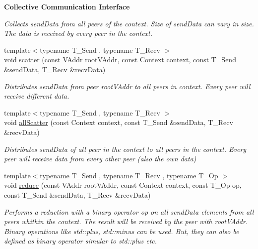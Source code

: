 \begin{Indent}{\bf Collective Communication Interface}
\begin{DoxyCompactItemize}
\begin{DoxyCompactList}\small\item\em Collects {\itshape send\+Data} from all peers of the {\itshape context}. Size of {\itshape send\+Data} can vary in size. The data is received by every peer in the {\itshape context}. \end{DoxyCompactList}\item 
{\footnotesize template$<$typename T\+\_\+\+Send , typename T\+\_\+\+Recv $>$ }\\void \hyperlink{structgraybat_1_1communicationPolicy_1_1Base_af1ed07ce5f107f04926d7b7c39c9834e}{scatter} (const V\+Addr root\+V\+Addr, const Context context, const T\+\_\+\+Send \&send\+Data, T\+\_\+\+Recv \&recv\+Data)
\begin{DoxyCompactList}\small\item\em Distributes {\itshape send\+Data} from peer {\itshape root\+V\+Addr} to all peers in {\itshape context}. Every peer will receive different data. \end{DoxyCompactList}\item 
{\footnotesize template$<$typename T\+\_\+\+Send , typename T\+\_\+\+Recv $>$ }\\void \hyperlink{structgraybat_1_1communicationPolicy_1_1Base_ac4aa66d3ed33c810ae48ae762b432b14}{all\+Scatter} (const Context context, const T\+\_\+\+Send \&send\+Data, T\+\_\+\+Recv \&recv\+Data)
\begin{DoxyCompactList}\small\item\em Distributes {\itshape send\+Data} of all peer in the {\itshape context} to all peers in the {\itshape context}. Every peer will receive data from every other peer (also the own data) \end{DoxyCompactList}\item 
{\footnotesize template$<$typename T\+\_\+\+Send , typename T\+\_\+\+Recv , typename T\+\_\+\+Op $>$ }\\void \hyperlink{structgraybat_1_1communicationPolicy_1_1Base_ad3bf74c91931b35b56fbb54ac535bc14}{reduce} (const V\+Addr root\+V\+Addr, const Context context, const T\+\_\+\+Op op, const T\+\_\+\+Send \&send\+Data, T\+\_\+\+Recv \&recv\+Data)
\begin{DoxyCompactList}\small\item\em Performs a reduction with a binary operator {\itshape op} on all {\itshape send\+Data} elements from all peers whithin the {\itshape context}. The result will be received by the peer with {\itshape root\+V\+Addr}. Binary operations like std\+::plus, std\+::minus can be used. But, they can also be defined as binary operator simular to std\+::plus etc. \end{DoxyCompactList}\item 

\end{DoxyCompactItemize}
\end{Indent}
